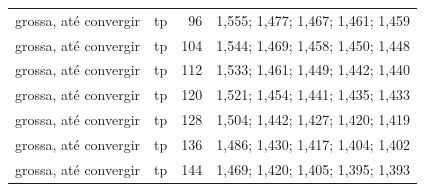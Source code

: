 \begin{tabular}{llr|l}
grossa, até convergir & tp & 96 & 1{,}555; 1{,}477; 1{,}467; 1{,}461; 1{,}459\\
grossa, até convergir & tp & 104 & 1{,}544; 1{,}469; 1{,}458; 1{,}450; 1{,}448\\
grossa, até convergir & tp & 112 & 1{,}533; 1{,}461; 1{,}449; 1{,}442; 1{,}440\\
grossa, até convergir & tp & 120 & 1{,}521; 1{,}454; 1{,}441; 1{,}435; 1{,}433\\
grossa, até convergir & tp & 128 & 1{,}504; 1{,}442; 1{,}427; 1{,}420; 1{,}419\\
grossa, até convergir & tp & 136 & 1{,}486; 1{,}430; 1{,}417; 1{,}404; 1{,}402\\
grossa, até convergir & tp & 144 & 1{,}469; 1{,}420; 1{,}405; 1{,}395; 1{,}393\\
\bottomrule
\end{tabular}
